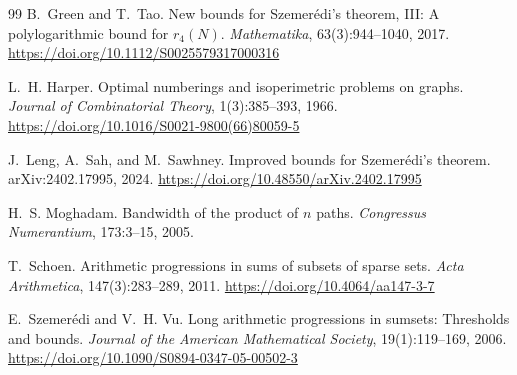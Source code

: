\documentclass[11pt]{article}
\numberwithin{equation}{section}
\theoremstyle{definition}
\theoremstyle{remark}
\begin{document}
\begin{thebibliography}{99}
B.~Green and T.~Tao.
\newblock New bounds for {Szemer{\'e}di}'s theorem, {III}: A polylogarithmic bound for {$r_4(N)$}.
\newblock \emph{Mathematika}, 63(3):944--1040, 2017.
\newblock \url{https://doi.org/10.1112/S0025579317000316}

L.~H. Harper.
\newblock Optimal numberings and isoperimetric problems on graphs.
\newblock \emph{Journal of Combinatorial Theory}, 1(3):385--393, 1966.
\newblock \url{https://doi.org/10.1016/S0021-9800(66)80059-5}

J.~Leng, A.~Sah, and M.~Sawhney.
\newblock Improved bounds for {Szemer{\'e}di}'s theorem.
\newblock arXiv:2402.17995, 2024.
\newblock \url{https://doi.org/10.48550/arXiv.2402.17995}

H.~S. Moghadam.
\newblock Bandwidth of the product of {$n$} paths.
\newblock \emph{Congressus Numerantium}, 173:3--15, 2005.

T.~Schoen.
\newblock Arithmetic progressions in sums of subsets of sparse sets.
\newblock \emph{Acta Arithmetica}, 147(3):283--289, 2011.
\newblock \url{https://doi.org/10.4064/aa147-3-7}

E.~Szemer{\'e}di and V.~H. Vu.
\newblock Long arithmetic progressions in sumsets: Thresholds and bounds.
\newblock \emph{Journal of the American Mathematical Society}, 19(1):119--169, 2006.
\newblock \url{https://doi.org/10.1090/S0894-0347-05-00502-3}

\end{thebibliography}
\end{document}
